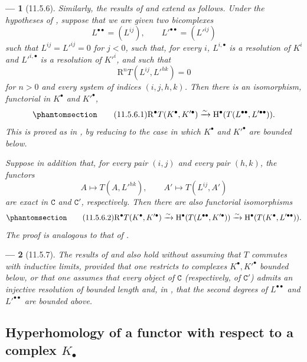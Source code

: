 \documentclass[oneside]{amsart}
\theoremstyle{ega-env-style}
\newtheorem*{env}{---}
\theoremstyle{ega-thm-env-style}
\theoremstyle{ega-defn-env-style}
\def\cat{\mathtt}                   %
\def\HH{\mathrm{H}}                 %
\def\RR{\mathrm{R}}                 %
\def\simto{\xrightarrow{\sim}}
\let\EGAOriginalLabel\label
\renewcommand{\label}[1]{\phantomsection\EGAOriginalLabel{#1}}
\begin{document}
\begin{env}[11.5.6]
\label{0.11.5.6}
Similarly, the results of  and  extend as follows.
Under the hypotheses of , suppose that we are given two bicomplexes
\[
  L^{\bullet\bullet}=(L^{ij}),\qquad
  L'^{\bullet\bullet}=(L'^{ij})
\]
such that $L^{ij}=L'^{ij}=0$ for $j<0$, such that, for every $i$, $L^{i,\bullet}$ is a resolution of $K^i$ and $L'^{i,\bullet}$ is a resolution of $K'^i$, and such that
\[
  \RR^nT(L^{ij},L'^{hk})=0
\]
for $n>0$ and every system of indices $(i,j,h,k)$.
Then there is an isomorphism, functorial in $K^\bullet$ and $K'^\bullet$,
\[
\label{0.11.5.6.1}
\tag{11.5.6.1}
  \RR^\bullet T(K^\bullet,K'^\bullet)
  \simto
  \HH^\bullet(T(L^{\bullet\bullet},L'^{\bullet\bullet})).
\]
This is proved as in , by reducing to the case in which $K^\bullet$ and $K'^\bullet$ are bounded below.

Suppose in addition that, for every pair $(i,j)$ and every pair $(h,k)$, the functors
\[
  A\longmapsto T(A,L'^{hk}),
  \qquad
  A'\longmapsto T(L^{ij},A')
\]
are exact in $\cat{C}$ and $\cat{C}'$, respectively.
Then there are also functorial isomorphisms
\[
\label{0.11.5.6.2}
\tag{11.5.6.2}
  \RR^\bullet T(K^\bullet,K'^\bullet)
  \simto
  \HH^\bullet(T(L^{\bullet\bullet},K'^\bullet))
  \simto
  \HH^\bullet(T(K^\bullet,L'^{\bullet\bullet})).
\]
The proof is analogous to that of .
\end{env}

\begin{env}[11.5.7]
\label{0.11.5.7}
The results of  and  also hold without assuming that $T$ commutes with inductive limits, provided that one restricts to complexes $K^\bullet,K'^\bullet$ bounded below, or that one assumes that every object of $\cat{C}$ (respectively, of $\cat{C}'$) admits an injective resolution of bounded length and, in , that the second degrees of $L^{\bullet\bullet}$ and $L'^{\bullet\bullet}$ are bounded above.
\end{env}

\subsection{Hyperhomology of a functor with respect to a complex $K_{\bullet}$}
\label{subsection:0.11.6}
\end{document}
